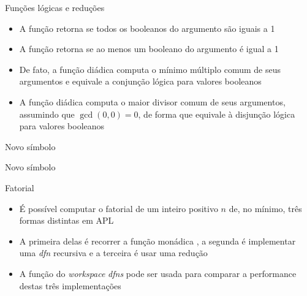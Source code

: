 \begin{frame}[fragile]{Funções lógicas e reduções}

    \begin{itemize}
        \item A função  retorna  se todos os booleanos do argumento são iguais a 1

        \item A função  retorna  se ao menos um booleano do argumento é igual a 1

        \item De fato, a função diádica  computa o mínimo múltiplo comum de seus argumentos e equivale a conjunção lógica para valores booleanos

        \item A função diádica  computa o maior divisor comum de seus argumentos, assumindo que $\gcd(0, 0) = 0$, de forma que equivale à disjunção lógica para valores booleanos
    \end{itemize}
\end{frame}

\begin{frame}[fragile]{Novo símbolo}


\end{frame}

\begin{frame}[fragile]{Novo símbolo}

\end{frame}

\begin{frame}[fragile]{Fatorial}

    \begin{itemize}
        \item É possível computar o fatorial de um inteiro positivo $n$  de, no mínimo, três formas
            distintas em APL

        \item A primeira delas é recorrer a função monádica , a segunda é 
            implementar uma \textit{dfn} recursiva e a terceira é usar uma redução

        \item A função  do \textit{workspace} \textit{dfns} pode ser usada para
            comparar a performance destas três implementações
    \end{itemize}

\end{frame}

